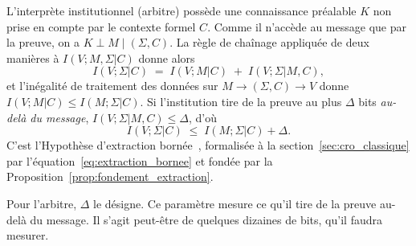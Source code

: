 \begin{sloppypar}
L'interpr\`ete institutionnel (arbitre) poss\`ede une connaissance pr\'ealable $K$
non prise en compte par le contexte formel $C$. Comme il n'acc\`ede au message que par la
preuve, on a $K \perp M \mid (\Sigma, C)$. La r\`egle de cha\^inage appliqu\'ee de deux
mani\`eres \`a $I(V;M,\Sigma|C)$ donne alors
\begin{equation}
I(V;\Sigma|C) \;=\; I(V;M|C) \;+\; I(V;\Sigma|M,C),
\label{eq:chaining_knowledge}
\end{equation}
et l'in\'egalit\'e de traitement des donn\'ees sur $M \to (\Sigma,C) \to V$ donne
$I(V;M|C) \leq I(M;\Sigma|C)$. Si l'institution tire de la preuve au plus
$\Delta$ bits \emph{au-del\`a du message}, $I(V;\Sigma|M,C) \leq \Delta$, d'o\`u
\begin{equation}
I(V;\Sigma|C) \;\leq\; I(M;\Sigma|C) + \Delta.
\label{eq:extraction_bornee_etat_art}
\end{equation}
C'est l'Hypoth\`ese d'extraction born\'ee~\cite{Smith09}, formalis\'ee \`a la
section~\ref{sec:cro_classique} par l'\'equation~\eqref{eq:extraction_bornee} et
fond\'ee par la Proposition~\ref{prop:fondement_extraction}.
\end{sloppypar}

\begin{boiteArbitre}
Pour l'arbitre, $\Delta$ le d\'esigne. Ce param\`etre mesure ce qu'il tire
de la preuve au-del\`a du message. Il s'agit peut-\^etre de quelques dizaines de bits, qu'il faudra mesurer.
\end{boiteArbitre}

